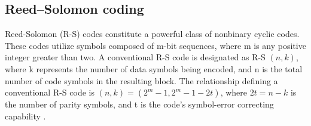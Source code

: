 \label{subsec:role-fec}

\subsection{ Reed--Solomon coding}\label{subsec:block-codes}

Reed-Solomon (R-S) codes constitute a powerful class of nonbinary cyclic codes. These codes utilize symbols composed of m-bit sequences, where m is any positive integer greater than two. A conventional R-S code is designated as R-S $(n,k)$, where k represents the number of data symbols being encoded, and n is the total number of code symbols in the resulting block. The relationship defining a conventional R-S code is $(n, k) = (2^{m}-1, 2^{m}-1-2t)$, where $2t = n-k$ is the number of parity symbols, and t is the code's symbol-error correcting capability \cite{sklar2001reed}.








